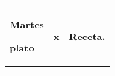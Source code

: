 \documentclass[menu.tex]{subfiles}
\begin{document}
\begin{tabular} {p{3.5cm} p{4cm} p{9cm}}
\pbox{20cm}
{
    \rule{0pt}{3ex}\begin{large}\textbf{Martes}\end{large}\\ 
    \rule{0pt}{2ex}plato
} & 
\vspace{-0.1cm}            
\begin{compactitem} 
    \begin{scriptsize}
        \item x
    \end{scriptsize}
\end{compactitem}&
\vspace{-0.1cm}
Receta.\\
\hline
\newpage
\end{tabular}
\end{document}
